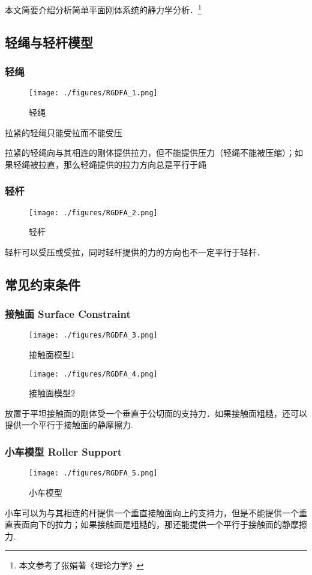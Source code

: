 
本文简要介绍分析简单平面刚体系统的静力学分析．\footnote{本文参考了张娟著《理论力学》}

\subsection{轻绳与轻杆模型}
\subsubsection{轻绳}
\begin{figure}[ht]
\centering
\texttt{[image: ./figures/RGDFA\_1.png]}
\caption{轻绳} \label{RGDFA_fig1}
\end{figure}
拉紧的轻绳只能受拉而不能受压

拉紧的轻绳向与其相连的刚体提供拉力，但不能提供压力（轻绳不能被压缩）；如果轻绳被拉直，那么轻绳提供的拉力方向总是平行于绳

\subsubsection{轻杆}
\begin{figure}[ht]
\centering
\texttt{[image: ./figures/RGDFA\_2.png]}
\caption{轻杆} \label{RGDFA_fig2}
\end{figure}
轻杆可以受压或受拉，同时轻杆提供的力的方向也不一定平行于轻杆．

\subsection{常见约束条件}
\subsubsection{接触面 Surface Constraint}
\begin{figure}[ht]
\centering
\texttt{[image: ./figures/RGDFA\_3.png]}
\caption{接触面模型1} \label{RGDFA_fig3}
\end{figure}
\begin{figure}[ht]
\centering
\texttt{[image: ./figures/RGDFA\_4.png]}
\caption{接触面模型2} \label{RGDFA_fig4}
\end{figure}
放置于平坦接触面的刚体受一个垂直于公切面的支持力．如果接触面粗糙，还可以提供一个平行于接触面的静摩擦力.
\subsubsection{小车模型 Roller Support}
\begin{figure}[ht]
\centering
\texttt{[image: ./figures/RGDFA\_5.png]}
\caption{小车模型} \label{RGDFA_fig5}
\end{figure}
小车可以为与其相连的杆提供一个垂直接触面向上的支持力，但是不能提供一个垂直表面向下的拉力；如果接触面是粗糙的，那还能提供一个平行于接触面的静摩擦力.
